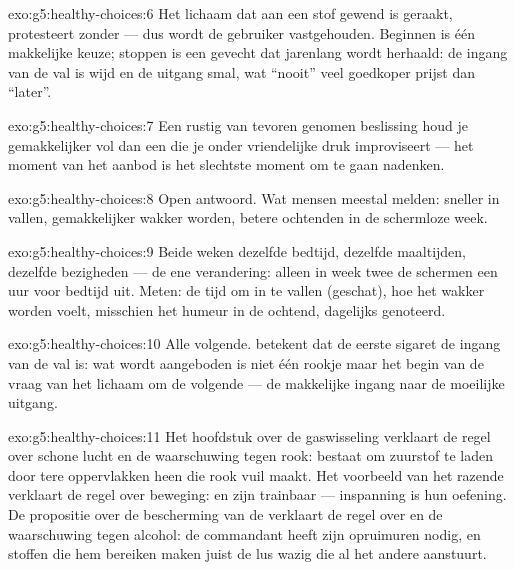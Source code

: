 \begin{solution}{exo:g5:healthy-choices:6}
Het lichaam dat aan een stof gewend is geraakt, protesteert zonder ---
dus wordt de gebruiker vastgehouden. Beginnen is één makkelijke keuze;
stoppen is een gevecht dat jarenlang wordt herhaald: de ingang van de
val is wijd en de uitgang smal, wat ``nooit'' veel goedkoper prijst dan
``later''.
\end{solution}

\begin{solution}{exo:g5:healthy-choices:7}
Een rustig van tevoren genomen beslissing houd je gemakkelijker vol dan
een die je onder vriendelijke druk improviseert --- het moment van het
aanbod is het slechtste moment om te gaan nadenken.
\end{solution}

\begin{solution}{exo:g5:healthy-choices:8}
Open antwoord. Wat mensen meestal melden: sneller in  vallen,
gemakkelijker wakker worden, betere ochtenden in de schermloze week.
\end{solution}

\begin{solution}{exo:g5:healthy-choices:9}
Beide weken dezelfde bedtijd, dezelfde maaltijden, dezelfde bezigheden
--- de ene verandering: alleen in week twee de schermen een uur voor
bedtijd uit. Meten: de tijd om in  te vallen (geschat), hoe het
wakker worden voelt, misschien het humeur in de ochtend, dagelijks
genoteerd.
\end{solution}

\begin{solution}{exo:g5:healthy-choices:10}
Alle volgende.  betekent dat de eerste sigaret de ingang van
de val is: wat wordt aangeboden is niet één rookje maar het begin van de
vraag van het lichaam om de volgende --- de makkelijke ingang naar de
moeilijke uitgang.
\end{solution}

\begin{solution}{exo:g5:healthy-choices:11}
Het hoofdstuk over de gaswisseling verklaart de regel over schone lucht
en de waarschuwing tegen rook:  bestaat om zuurstof te laden
door tere oppervlakken heen die rook vuil maakt. Het voorbeeld van het
razende  verklaart de regel over beweging:  en  zijn
trainbaar --- inspanning is hun oefening. De propositie over de
bescherming van de  verklaart de regel over  en de
waarschuwing tegen alcohol: de commandant heeft zijn opruimuren nodig,
en stoffen die hem bereiken maken juist de lus wazig die al het andere
aanstuurt.
\end{solution}
